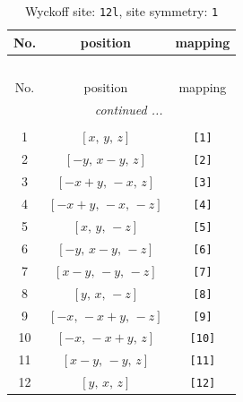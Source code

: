 \documentclass[fleqn,8pt]{jsarticle}
\begin{document}
\begin{longtable}{ccc}
\caption{Wyckoff site: {\tt 12l}, site symmetry: {\tt 1}}
 \\
 \hline \hline
No. & position & mapping \\ \hline \endfirsthead

\multicolumn{2}{l}{\tablename\ \thetable{}} \\
 \hline \hline
No. & position & mapping \\ \hline \endhead

 \hline \hline
\multicolumn{2}{r}{\footnotesize\it continued ...} \\ \endfoot

 \hline \hline
\multicolumn{2}{r}{} \\ \endlastfoot

1 & $\left[ x,\, y,\, z \right]$ & {\tt [1]} \\ \hline
2 & $\left[ - y,\, x - y,\, z \right]$ & {\tt [2]} \\ \hline
3 & $\left[ - x + y,\, - x,\, z \right]$ & {\tt [3]} \\ \hline
4 & $\left[ - x + y,\, - x,\, - z \right]$ & {\tt [4]} \\ \hline
5 & $\left[ x,\, y,\, - z \right]$ & {\tt [5]} \\ \hline
6 & $\left[ - y,\, x - y,\, - z \right]$ & {\tt [6]} \\ \hline
7 & $\left[ x - y,\, - y,\, - z \right]$ & {\tt [7]} \\ \hline
8 & $\left[ y,\, x,\, - z \right]$ & {\tt [8]} \\ \hline
9 & $\left[ - x,\, - x + y,\, - z \right]$ & {\tt [9]} \\ \hline
10 & $\left[ - x,\, - x + y,\, z \right]$ & {\tt [10]} \\ \hline
11 & $\left[ x - y,\, - y,\, z \right]$ & {\tt [11]} \\ \hline
12 & $\left[ y,\, x,\, z \right]$ & {\tt [12]} \\
\end{longtable}
\end{document}
